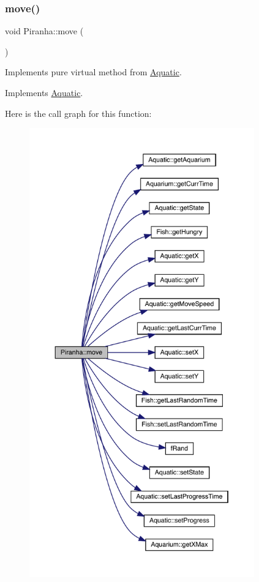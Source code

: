\subsubsection{\texorpdfstring{move()}{move()}}
{\footnotesize\ttfamily void Piranha\+::move (\begin{DoxyParamCaption}{ }\end{DoxyParamCaption})\hspace{0.3cm}{\ttfamily [virtual]}}



Implements pure virtual method from \mbox{\hyperlink{class_aquatic}{Aquatic}}. 



Implements \mbox{\hyperlink{class_aquatic_a962e93c804814eeaf3cea6e26698eef7}{Aquatic}}.

Here is the call graph for this function\+:\nopagebreak
\begin{figure}[H]
\begin{center}
\leavevmode
\includegraphics[height=550pt]{class_piranha_a6b86e73b3e5a57ee0fdb768c24ab9b67_cgraph}
\end{center}
\end{figure}
